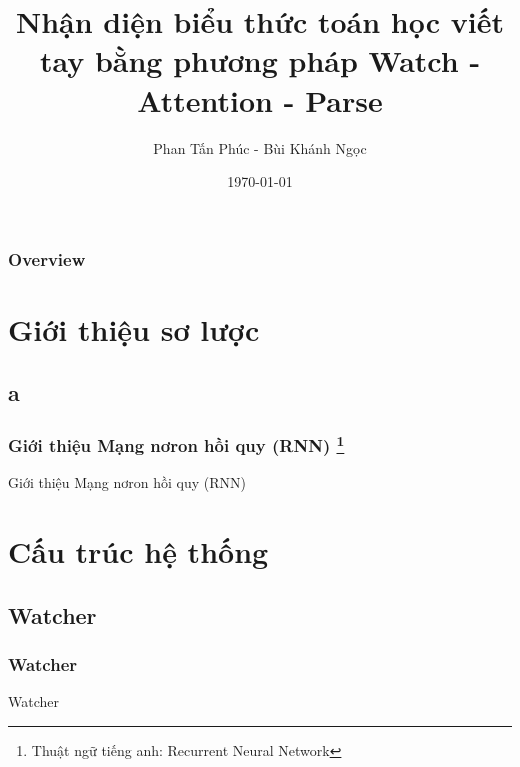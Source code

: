 \documentclass{beamer}
\title[Nhận diện biểu thức toán học viết tay]{Nhận diện biểu thức toán học viết tay bằng phương pháp Watch - Attention - Parse}
\author{Phan Tấn Phúc - Bùi Khánh Ngọc} %
\institute[BKU] %
{
Ho Chi Minh City University of Technology \\ %
\medskip
\textit{\{phantanphuc2512, buikhanhngoc142\}@gmail.com} %
}
\date{\today} %
\begin{document}
\begin{frame}
\titlepage %
\end{frame}

\begin{frame}
\frametitle{Overview} %
\setcounter{tocdepth}{1}
\tableofcontents %
\end{frame}




\section{Giới thiệu sơ lược}
\subsection{a}

\begin{frame}
	\frametitle{Giới thiệu Mạng nơron hồi quy (RNN) \footnote{Thuật ngữ tiếng anh: Recurrent Neural Network}}
	{\Huge Giới thiệu Mạng nơron hồi quy (RNN)}
\end{frame}

\section{Cấu trúc hệ thống}
\subsection{Watcher}

\begin{frame}
	\frametitle{Watcher}
	{\Huge Watcher}
\end{frame}
\end{document}
